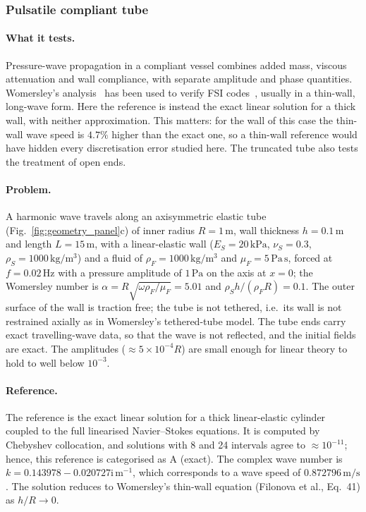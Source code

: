 \subsubsection{Pulsatile compliant tube}\label{sec:womersley}

\paragraph{What it tests.}
Pressure-wave propagation in a compliant vessel combines added mass, viscous attenuation and wall compliance, with separate amplitude and phase quantities.
Womersley's analysis~\citep{Womersley1955, Womersley1957} has been used to verify FSI codes~\citep{Filonova2020, Hessenthaler2020}, usually in a thin-wall, long-wave form.
Here the reference is instead the exact linear solution for a thick wall, with neither approximation.
This matters: for the wall of this case the thin-wall wave speed is $4.7\%$ higher than the exact one, so a thin-wall reference would have hidden every discretisation error studied here.
The truncated tube also tests the treatment of open ends.

\paragraph{Problem.}
A harmonic wave travels along an axisymmetric elastic tube (Fig.~\ref{fig:geometry_panel}c) of inner radius $R = 1\,\mathrm{m}$, wall thickness $h = 0.1\,\mathrm{m}$ and length $L = 15\,\mathrm{m}$, with a linear-elastic wall ($E_S = 20\,\mathrm{kPa}$, $\nu_S = 0.3$, $\rho_S = 1000\,\mathrm{kg/m^3}$) and a fluid of $\rho_F = 1000\,\mathrm{kg/m^3}$ and $\mu_F = 5\,\mathrm{Pa\,s}$, forced at $f = 0.02\,\mathrm{Hz}$ with a pressure amplitude of $1\,\mathrm{Pa}$ on the axis at $x = 0$; the Womersley number is $\alpha = R\sqrt{\omega\rho_F/\mu_F} = 5.01$ and $\rho_S h/(\rho_F R) = 0.1$.
The outer surface of the wall is traction free; the tube is not tethered, i.e.\ its wall is not restrained axially as in Womersley's tethered-tube model.
The tube ends carry exact travelling-wave data, so that the wave is not reflected, and the initial fields are exact.
The amplitudes ($\approx5\times10^{-4}R$) are small enough for linear theory to hold to well below $10^{-3}$.

\paragraph{Reference.}
The reference is the exact linear solution for a thick linear-elastic cylinder coupled to the full linearised Navier--Stokes equations.
It is computed by Chebyshev collocation, and solutions with 8 and 24 intervals agree to $\approx10^{-11}$; hence, this reference is categorised as A (exact).
The complex wave number is $k = 0.143978 - 0.020727\mathrm{i}\,\mathrm{m^{-1}}$, which corresponds to a wave speed of $0.872796\,\mathrm{m/s}$.
The solution reduces to Womersley's thin-wall equation (Filonova et al., Eq.~41) as $h/R\to0$.

